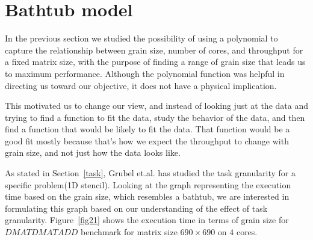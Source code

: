 \section{Bathtub model}
In the previous section we studied the possibility of using a polynomial to capture the relationship between grain size, number of cores, and throughput for a fixed matrix size, with the purpose of finding a range of grain size that leads us to maximum performance. 
Although the polynomial function was helpful in directing us toward our objective, it does not have a physical implication. 

This motivated us to change our view, and instead of looking just at the data and trying to find a function to fit the data, study the behavior of the data, and then find a function that would be likely to fit the data. That function would be a good fit mostly because that's how we expect the throughput to change with grain size, and not just how the data looks like.   

As stated in Section~\ref{task}, Grubel et.al.\cite{grubel2015performance} has studied the task granularity for a specific problem(1D stencil). Looking at the graph representing the execution time based on the grain size, which resembles a bathtub, we are interested in formulating this graph based on our understanding of the effect of task granularity. Figure~\ref{fig21} shows the execution time in terms of grain size for $DMATDMATADD$ benchmark for matrix size $690\times690$ on $4$ cores.

